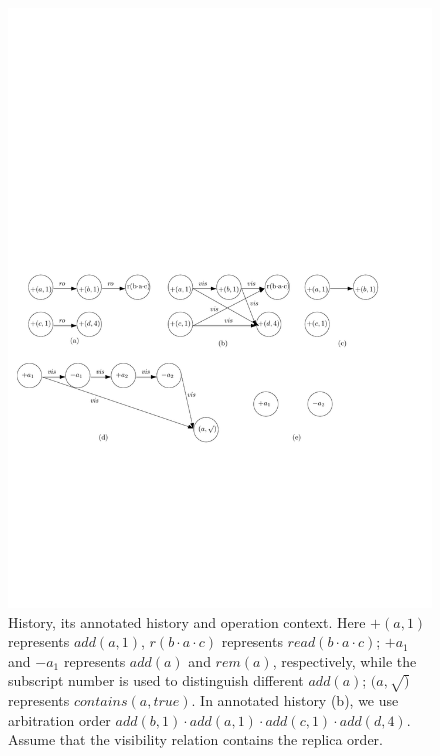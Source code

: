 \begin{figure}[t]
  \centering
  \includegraphics[width=0.75 \textwidth]{figures/PIC-his-anhis-context.pdf}
  \caption{History, its annotated history and operation context. Here $+(a,1)$ represents $\mathit{add}(a,1)$, $r(b \cdot a \cdot c)$ represents $\mathit{read}(b \cdot a \cdot c)$; $+a_1$ and $-a_1$ represents $\mathit{add}(a)$ and $\mathit{rem}(a)$, respectively, while the subscript number is used to distinguish different $\mathit{add(a)}$; $(a,\surd)$ represents $\mathit{contains}(a,\mathit{true})$. In annotated history (b), we use arbitration order $\mathit{add}(b,1) \cdot \mathit{add}(a,1) \cdot \mathit{add}(c,1) \cdot \mathit{add}(d,4)$. Assume that the visibility relation contains the replica order.}
  \label{fig:history, annotated history and operation context}
\end{figure}


